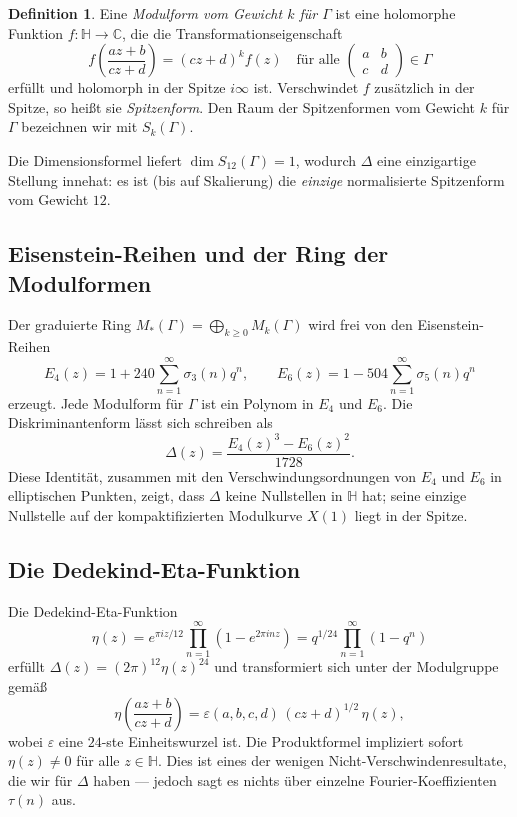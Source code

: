 \documentclass[12pt,a4paper]{amsart}
\theoremstyle{definition}
\newtheorem{definition}[theorem]{Definition}
\begin{document}
\begin{definition}
Eine \emph{Modulform vom Gewicht $k$ für $\Gamma$} ist eine holomorphe Funktion
$f : \mathbb{H} \to \mathbb{C}$, die die Transformationseigenschaft
\[
  f\!\left(\frac{az+b}{cz+d}\right) = (cz+d)^k f(z)
  \quad \text{für alle } \begin{pmatrix}a&b\\c&d\end{pmatrix} \in \Gamma
\]
erfüllt und holomorph in der Spitze $i\infty$ ist. Verschwindet $f$ zusätzlich in
der Spitze, so heißt sie \emph{Spitzenform}. Den Raum der Spitzenformen vom Gewicht
$k$ für $\Gamma$ bezeichnen wir mit $S_k(\Gamma)$.
\end{definition}

Die Dimensionsformel liefert $\dim S_{12}(\Gamma) = 1$, wodurch $\Delta$ eine
einzigartige Stellung innehat: es ist (bis auf Skalierung) die \emph{einzige}
normalisierte Spitzenform vom Gewicht $12$.

\subsection{Eisenstein-Reihen und der Ring der Modulformen}

Der graduierte Ring $M_*(\Gamma) = \bigoplus_{k \geq 0} M_k(\Gamma)$ wird frei von
den Eisenstein-Reihen
\[
  E_4(z) = 1 + 240\sum_{n=1}^\infty \sigma_3(n)q^n, \qquad
  E_6(z) = 1 - 504\sum_{n=1}^\infty \sigma_5(n)q^n
\]
erzeugt. Jede Modulform für $\Gamma$ ist ein Polynom in $E_4$ und $E_6$.
Die Diskriminantenform lässt sich schreiben als
\begin{equation}\label{eq:delta-E4E6}
  \Delta(z) = \frac{E_4(z)^3 - E_6(z)^2}{1728}.
\end{equation}
Diese Identität, zusammen mit den Verschwindungsordnungen von $E_4$ und $E_6$ in
elliptischen Punkten, zeigt, dass $\Delta$ keine Nullstellen in $\mathbb{H}$ hat;
seine einzige Nullstelle auf der kompaktifizierten Modulkurve $X(1)$ liegt in der
Spitze.

\subsection{Die Dedekind-Eta-Funktion}

Die Dedekind-Eta-Funktion
\[
  \eta(z) = e^{\pi i z/12} \prod_{n=1}^\infty (1 - e^{2\pi i n z})
  = q^{1/24} \prod_{n=1}^\infty (1 - q^n)
\]
erfüllt $\Delta(z) = (2\pi)^{12} \eta(z)^{24}$ und transformiert sich unter der
Modulgruppe gemäß
\[
  \eta\!\left(\frac{az+b}{cz+d}\right)
  = \varepsilon(a,b,c,d)\,(cz+d)^{1/2}\,\eta(z),
\]
wobei $\varepsilon$ eine $24$-ste Einheitswurzel ist. Die Produktformel impliziert
sofort $\eta(z) \neq 0$ für alle $z \in \mathbb{H}$. Dies ist eines der wenigen
Nicht-Verschwindenresultate, die wir für $\Delta$ haben --- jedoch sagt es nichts
über einzelne Fourier-Koeffizienten $\tau(n)$ aus.
\end{document}
